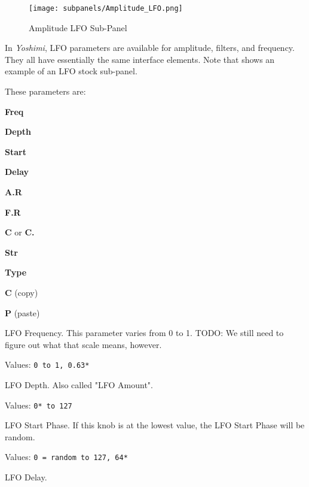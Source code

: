   \setcounter{ItemCounter}{0}      %

\begin{figure}[H]
   \centering 
   \texttt{[image: subpanels/Amplitude\_LFO.png]}
   \caption[Amplitude LFO Sub-Panel]{Amplitude LFO Sub-Panel}
   \label{fig:amplitude_lfo}
\end{figure}

   In \textsl{Yoshimi}, LFO parameters are available for amplitude, filters,
   and frequency.  They all have essentially the same interface elements.
   Note that
    shows an example of an LFO stock sub-panel.

These parameters are:

   \begin{enumber}
      \item \textbf{Freq}
      \item \textbf{Depth}
      \item \textbf{Start}
      \item \textbf{Delay}
      \item \textbf{A.R}
      \item \textbf{F.R}
      \item \textbf{C} or \textbf{C.}
      \item \textbf{Str}
      \item \textbf{Type}
      \item \textbf{C} (copy)
      \item \textbf{P} (paste)
   \end{enumber}

   \setcounter{ItemCounter}{0}      %

   LFO Frequency.
   This parameter varies from 0 to 1.
   TODO: We still need to figure out what that scale means, however.

   Values: \texttt{0 to 1, 0.63*}

   LFO Depth.  Also called "LFO Amount".

   Values: \texttt{0* to 127}

   LFO Start Phase. If this knob is at the lowest value, the LFO Start
   Phase will be random.

   Values: \texttt{0 = random to 127, 64*}

   LFO Delay.

